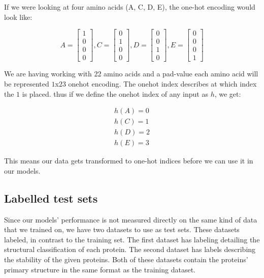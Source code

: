 \noindent
If we were looking at four amino acids (A, C, D, E), the one-hot encoding would look like:

$$
A = \begin{bmatrix}
1 \\
0 \\
0 \\
0
\end{bmatrix},
C = \begin{bmatrix}
0 \\
1 \\
0 \\
0
\end{bmatrix},
D= \begin{bmatrix}
0 \\
0 \\
1 \\
0
\end{bmatrix},
E= \begin{bmatrix}
0 \\
0 \\
0 \\
1
\end{bmatrix}
$$

\noindent
We are having working with 22 amino acids and a pad-value each amino acid will be represented $1$x$23$ onehot encoding. The onehot index describes at which index the $1$ is placed. thus if we define the onehot index of any input as $h$, we get:

\begin{align}
h(A) = 0 \\
h(C) = 1 \\
h(D) = 2 \\
h(E) = 3
\end{align}

\noindent
This means our data gets transformed to one-hot indices before we can use it in our models.

\subsection{Labelled test sets}
Since our models' performance is not measured directly on the same kind of data that we trained on, we have two datasets to use as test sets. These datasets labeled, in contrast to the training set. The first dataset has labeling detailing the structural classification of each protein.\cite{scope} The second dataset has labels describing the stability of the given proteins.\cite{stability} Both of these datasets contain the proteins' primary structure in the same format as the training dataset.\\

